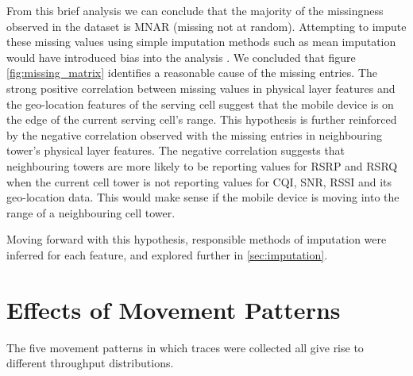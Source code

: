 From this brief analysis we can conclude that the majority of the missingness observed in the dataset is MNAR (missing not at random). Attempting to impute these missing values using simple imputation methods such as mean imputation would have introduced bias into the analysis \cite{DONDERS20061087}. We concluded that figure \ref{fig:missing_matrix} identifies a reasonable cause of the missing entries. The strong positive correlation between missing values in physical layer features and the geo-location features of the serving cell suggest that the mobile device is on the edge of the current serving cell's range. This hypothesis is further reinforced by the negative correlation observed with the missing entries in neighbouring tower's physical layer features. The negative correlation suggests that neighbouring towers are more likely to be reporting values for RSRP and RSRQ when the current cell tower is not reporting values for CQI, SNR, RSSI and its geo-location data. This would make sense if the mobile device is moving into the range of a neighbouring cell tower.

Moving forward with this hypothesis, responsible methods of imputation were inferred for each feature, and explored further in \ref{sec:imputation}.

\section{Effects of Movement Patterns}
The five movement patterns in which traces were collected all give rise to different throughput distributions. 
